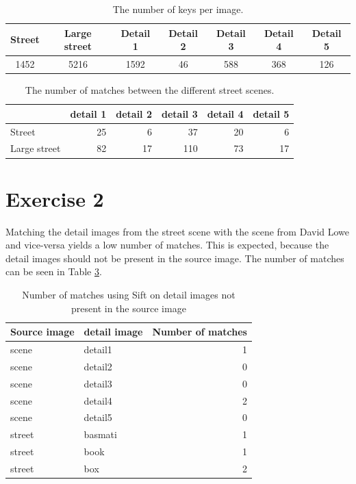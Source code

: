 \documentclass[11pt,a4paper]{article}
\begin{document}
\begin{table}
    \centering
    \begin{tabular}{c|c|c|c|c|c|c}
        Street & Large street & Detail 1 & Detail 2 & Detail 3 & Detail 4 & Detail 5 \\
        \hline
        1452 & 5216 & 1592 & 46 & 588 & 368 & 126 \\
    \end{tabular}
    \caption{The number of keys per image.}
    \label{tab:streetkeys}
\end{table}

\begin{table}
    \centering
    \begin{tabular}{l|r|r|r|r|r|}
        & detail 1 & detail 2 & detail 3 & detail 4 & detail 5 \\
        \hline
        Street & 25 & 6 & 37 & 20 & 6 \\
        \hline
        Large street & 82 & 17 & 110 & 73 & 17 \\
        \hline
    \end{tabular}
    \caption{The number of matches between the different street scenes.}
    \label{tab:streetdetails}
\end{table}

\section*{Exercise 2}
Matching the detail images from the street scene with the scene from David Lowe and vice-versa yields a low number of matches.
This is expected, because the detail images should not be present in the source image. The number of matches can be seen in Table \ref{tab:mismatches}.
\begin{table}[H]
	\centering
	\begin{tabular}{l|l|r}
		Source image & detail image & Number of matches\\
		\hline
		scene & detail1 & 1\\
		scene & detail2 & 0\\
		scene & detail3 & 0\\
		scene & detail4 & 2\\
		scene & detail5 & 0\\
		street & basmati & 1\\
		street & book & 1\\
		street & box & 2
	\end{tabular}
	\caption{Number of matches using Sift on detail images not present in the source image}
	\label{tab:mismatches}
\end{table}
\end{document}
